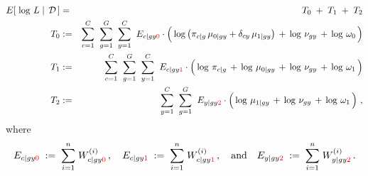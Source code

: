 \begin{eqnarray*}
E\!\left[\,\left.\log\,L\;\right\vert\;\mathcal{D}\,\right]
&=& T_{0} \;+\; T_{1} \;+\; T_{2}
\\
T_{0}
&:=&
	\overset{C}{\underset{c=1}{\sum}}\;\;
	\overset{G}{\underset{g=1}{\sum}}\;\;
	\overset{C}{\underset{y=1}{\sum}}\;\;
	E_{c \vert gy{\color{red}0}}
	\cdot
	\left(\,
		\log\left(\pi_{c \vert g}\,\mu_{0 \vert gy} + \delta_{cy}\,\mu_{1\vert gy}\right)
		\,\overset{{\color{white}.}}{+}\,
		\log\,\nu_{gy}
		\,\overset{{\color{white}.}}{+}\,
		\log\,\omega_{0}
	\,\right)
\\
T_{1}
&:=&
	\overset{C}{\underset{c=1}{\sum}}\;\;
	\overset{G}{\underset{g=1}{\sum}}\;\;
	\overset{C}{\underset{y=1}{\sum}}\;\;
	E_{c \vert gy{\color{red}1}}
	\cdot
	\left(\,
		\log\,\pi_{c \vert g}
		\,\overset{{\color{white}.}}{+}\,
		\log\,\mu_{0\vert gy}
		\,\overset{{\color{white}.}}{+}\,
		\log\,\nu_{gy}
		\,\overset{{\color{white}.}}{+}\,
		\log\,\omega_{1}
	\,\right)
\\
T_{2}
&:=&
	\overset{C}{\underset{y=1}{\sum}}\;\;
	\overset{G}{\underset{g=1}{\sum}}\;\;
	E_{y \vert gy{\color{red}2}}
	\cdot
	\left(\,
		\log\,\mu_{1 \vert gy}
		\,\overset{{\color{white}.}}{+}\,
		\log\,\nu_{gy}
		\,\overset{{\color{white}.}}{+}\,
		\log\,\omega_{1}
	\,\right)\,,
\end{eqnarray*}
where
\begin{equation*}
E_{c \vert gy{\color{red}0}} \;:=\; \overset{n}{\underset{i=1}{\sum}}\;W^{(i)}_{c \vert gy{\color{red}0}}\,,
\quad
E_{c \vert gy{\color{red}1}} \;:=\; \overset{n}{\underset{i=1}{\sum}}\;W^{(i)}_{c \vert gy{\color{red}1}}\,,
\quad\textnormal{and}\quad
E_{y \vert gy{\color{red}2}} \;:=\; \overset{n}{\underset{i=1}{\sum}}\;W^{(i)}_{y \vert gy{\color{red}2}}\,.
\end{equation*}

